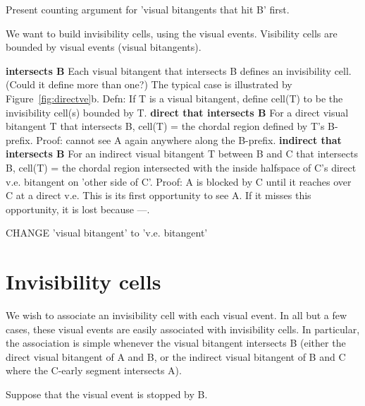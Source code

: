 \documentclass[12pt]{article}
\begin{document}
Present counting argument for 'visual bitangents that hit B' first.

We want to build invisibility cells, using the visual events.
Visibility cells are bounded by visual events (visual bitangents).

{\bf intersects B}
Each visual bitangent that intersects B defines an invisibility cell.
(Could it define more than one?)
The typical case is illustrated by Figure~\ref{fig:directve}b.
Defn: If T is a visual bitangent, define cell(T) to be the 
invisibility cell(s) bounded by T.
{\bf direct that intersects B}
For a direct visual bitangent T that intersects B, cell(T) = the chordal region 
defined by T's B-prefix.
Proof: cannot see A again anywhere along the B-prefix.
{\bf indirect that intersects B}
For an indirect visual bitangent T between B and C that intersects B, 
cell(T) = the chordal region intersected with the inside halfspace of C's direct v.e.
bitangent on 'other side of C'.
Proof: A is blocked by C until it reaches over C at a direct v.e.
This is its first opportunity to see A.  If it misses this opportunity, it is lost
because ---.

CHANGE 'visual bitangent' to 'v.e. bitangent'


\section{Invisibility cells}



We wish to associate an invisibility cell with each visual event.
In all but a few cases, these visual events are easily associated with invisibility cells.
In particular, the association is simple whenever the visual bitangent intersects B
(either the direct visual bitangent of A and B, or the indirect visual bitangent of
B and C where the C-early segment intersects A).

Suppose that the visual event is stopped by B.
\end{document}
